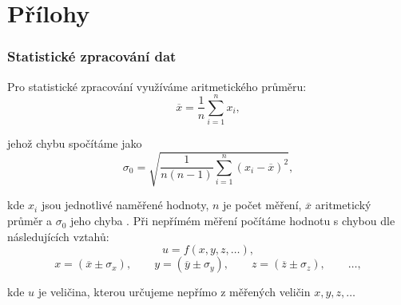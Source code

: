 \documentclass[english]{article}
\begin{document}
\clearpage
\part*{Přílohy}

\section{Statistické zpracování dat}
	Pro statistické zpracování využíváme aritmetického průměru:
	\begin{equation} \label{eq:aritmeticky_prumer}
	\overline{x} = \frac{1}{n}\sum\limits_{i=1}^{n}x_i,
	\end{equation}

%	
	
	
	jehož chybu spočítáme jako 
	\begin{equation} \label{eq:chyba_aritmetickeho_prumeru}
	\sigma_0 = \sqrt{\frac{1}{n(n-1)} \sum\limits_{i=1}^{n}\left( x_i - \overline{x} \right)^2 },
	\end{equation}
	
	kde $ x_i $ jsou jednotlivé naměřené hodnoty, $ n $ je počet měření, $ \overline{x} $ aritmetický průměr a $ \sigma_0 $ jeho chyba \cite{bib:chyby}.
%	
Při nepřímém měření počítáme hodnotu s chybou dle následujících vztahů:
	\begin{equation}
	u = f(x, y, z, \ldots),
	\end{equation}
	\begin{displaymath}
	x = (\overline{x} \pm \sigma_x), \qquad
	y = (\overline{y} \pm \sigma_y), \qquad
	z = (\overline{z} \pm \sigma_z), \qquad
	\ldots,
	\end{displaymath}
	
	kde $ u $ je veličina, kterou určujeme nepřímo z měřených veličin $ x, y, z, \ldots $ 
	
\end{document}
